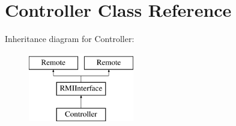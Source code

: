 \hypertarget{class_controller}{}\section{Controller Class Reference}
\label{class_controller}
Inheritance diagram for Controller\+:\begin{figure}[H]
\begin{center}
\leavevmode
\includegraphics[height=3.000000cm]{class_controller}
\end{center}
\end{figure}
